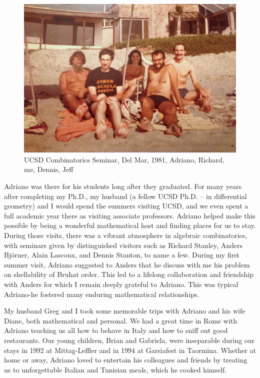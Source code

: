 \documentclass{notices}
\begin{document}
\begin{figure}
 \centering
    \includegraphics[width=0.95\linewidth]{Michelle_Wachs/IMG_2458.jpg} 
  {\footnotesize UCSD Combinatorics Seminar, Del Mar, 1981, Adriano, Richard, me, Dennis, Jeff}
\end{figure}
Adriano was there for his students long after they graduated.    For many years after completing my Ph.D., my husband (a fellow UCSD Ph.D. -- in differential geometry)  and I would
spend the summers visiting UCSD, and we even spent a full academic year there as visiting associate professors.   
Adriano helped make this possible by being a wonderful mathematical host and finding  places for us to stay.   
During those visits, there was a vibrant atmosphere in algebraic combinatorics, with seminars given
by distinguished visitors such as Richard Stanley, Anders Bj\"orner, Alain Lascoux, and Dennis Stanton, to name a few.
During my first summer visit, Adriano suggested to Anders that he discuss with me his problem  on shellability of Bruhat order.   This led to a lifelong collaboration and friendship with Anders for which I remain deeply grateful to Adriano. This was typical Adriano-he fostered many enduring mathematical relationships.

My husband Greg and I took some memorable trips with Adriano and his wife Diane, both mathematical and personal.  We had a great time in Rome with Adriano teaching us all how to behave in Italy and how to sniff out good restaurants. Our young children, Brian and Gabriela, were inseparable during our stays in 1992 at Mittag-Leffler and in 1994 at Garsiafest in Taormina. Whether at home or away,  Adriano loved to entertain his colleagues and friends by treating us to unforgettable Italian and Tunisian meals, which he cooked himself.
\end{document}
